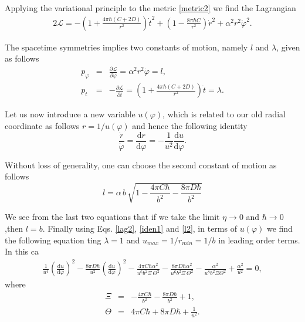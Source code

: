 \documentclass[preprint,superscriptaddress,amsfonts,amssymb,amsmath,showpacs]{revtex4}
\begin{document}
Applying the variational principle to the metric \eqref{metric2} we find the Lagrangian
\begin{eqnarray}\label{lag2}
2\mathcal{L}=-\left( 1+\frac{4 \pi \hbar (C+2D)}{r^2} \right)\dot{t}^2+\left( 1-\frac{8 \pi \hbar C}{r^2} \right) \dot{r}^2+\alpha^2 r^2 \dot{\varphi}^2.
\end{eqnarray}

The spacetime symmetries implies two constants of motion, namely $l$ and $\lambda$, given as follows \cite{Boyer}
\begin{eqnarray}
p_{\varphi}&=&\frac{\partial \mathcal{L}}{\partial \dot{\varphi}}= \alpha^2 r^2 \dot{\varphi}=l,\\
p_{t}&=&-\frac{\partial \mathcal{L}}{\partial \dot{t}}=\left( 1+\frac{4 \pi \hbar (C+2D)}{r^2}  \right)\dot{t}=\lambda.
\end{eqnarray}

Let us now introduce a new variable $u(\varphi)$, which is related to our old radial coordinate as follows $r=1/u(\varphi)$ and hence the following identity
\begin{equation}\label{iden1}
\frac{\dot{r}}{\dot{\varphi}}=\frac{\mathrm{d}r}{\mathrm{d}\varphi}=-\frac{1}{u^2}\frac{\mathrm{d}u}{\mathrm{d}\varphi}.
\end{equation}

Without loss of generality,  one can choose the second constant of motion as follows
\begin{equation}\label{l2}
l=\alpha \,b \,\sqrt{1-\frac{4 \pi C \hbar}{b^2}-\frac{8\pi D \hbar}{b^2}}
\end{equation}


We see from the last two equations that if we take the limit $\eta\to 0$ and $\hbar \to 0$,then $l=b$. Finally using Eqs. \eqref{lag2}, \eqref{iden1} and \eqref{l2}, in terms of $u(\varphi)$ we find the following equation
ting $\lambda=1$  and $u_{max}=1/r_{min}=1/b$  in leading order terms. In this ca
\begin{eqnarray}\label{diff2}
\frac{1}{u^4}\left( \frac{\mathrm{d}u}{\mathrm{d}\varphi} \right)^2-\frac{8 \pi D \hbar}{u^2}\left( \frac{\mathrm{d}u}{\mathrm{d}\varphi} \right)^2-\frac{4 \pi C \hbar \alpha^2}{u^6 b^2 \Xi \,\Theta^2}-\frac{8 \pi D \hbar \alpha^2}{u^6 b^2 \Xi \,\Theta^2}-\frac{\alpha^2}{u^8 b^2 \Xi \Theta^2}+\frac{\alpha^2}{u^2}=0,
\end{eqnarray}
where
\begin{eqnarray}
\Xi &=& -\frac{4 \pi C \hbar}{b^2}-\frac{8 \pi D \hbar }{b^2}+1, \\
\Theta & =& 4 \pi C \hbar +8 \pi D \hbar+\frac{1}{u^2}.
\end{eqnarray}
\end{document}
